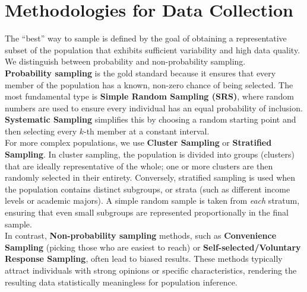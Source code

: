 \documentclass[12pt]{scrartcl}
\begin{document}
\section{Methodologies for Data Collection}
The ``best'' way to sample is defined by the goal of obtaining a representative subset of the population that exhibits sufficient variability and high data quality. We distinguish between probability and non-probability sampling. \\

\textbf{Probability sampling} is the gold standard because it ensures that every member of the population has a known, non-zero chance of being selected. The most fundamental type is \textbf{Simple Random Sampling (SRS)}, where random numbers are used to ensure every individual has an equal probability of inclusion. \textbf{Systematic Sampling} simplifies this by choosing a random starting point and then selecting every $k$-th member at a constant interval. \\

For more complex populations, we use \textbf{Cluster Sampling} or \textbf{Stratified Sampling}. In cluster sampling, the population is divided into groups (clusters) that are ideally representative of the whole; one or more clusters are then randomly selected in their entirety. Conversely, stratified sampling is used when the population contains distinct subgroups, or strata (such as different income levels or academic majors). A simple random sample is taken from \textit{each} stratum, ensuring that even small subgroups are represented proportionally in the final sample. \\

In contrast, \textbf{Non-probability sampling} methods, such as \textbf{Convenience Sampling} (picking those who are easiest to reach) or \textbf{Self-selected/Voluntary Response Sampling}, often lead to biased results. These methods typically attract individuals with strong opinions or specific characteristics, rendering the resulting data statistically meaningless for population inference.
\end{document}
